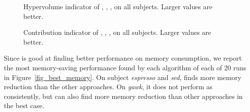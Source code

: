 \begin{figure}[htbp]
	\centering
	\vspace{-1.2em}
	\caption{Hypervolume indicator of \sr{}, \sn{}, \dr{}, \dn{} on all subjects. Larger values are better.}\label{fig_hypervolume}
\end{figure}

\begin{figure}[htbp]
	\centering
	\vspace{-1.2em}
	\caption{Contribution indicator of \sr{}, \sn{}, \dr{}, \dn{} on all subjects. Larger values are better.}\label{fig_contribution}
\end{figure}

Since \dn{} is good at finding better performance on memory consumption, we report the most memory-saving performance found by each algorithm of each of 20 runs in Figure~\ref{fig_best_memory}. On subject \emph{espresso} and \emph{sed}, \dn{} finds more memory reduction than the other approaches. On \emph{gawk}, it does not perform as consistently, but can also find more memory reduction than other approaches in the best case. 


